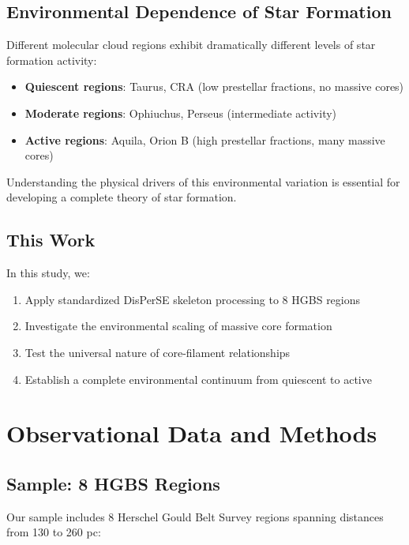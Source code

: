 \documentclass[11pt,a4paper]{article}
\begin{document}
\subsection{Environmental Dependence of Star Formation}

Different molecular cloud regions exhibit dramatically different levels of star formation activity:
\begin{itemize}
    \item \textbf{Quiescent regions}: Taurus, CRA (low prestellar fractions, no massive cores)
    \item \textbf{Moderate regions}: Ophiuchus, Perseus (intermediate activity)
    \item \textbf{Active regions}: Aquila, Orion B (high prestellar fractions, many massive cores)
\end{itemize}

Understanding the physical drivers of this environmental variation is essential for developing a complete theory of star formation.

\subsection{This Work}

In this study, we:
\begin{enumerate}
    \item Apply standardized DisPerSE skeleton processing to 8 HGBS regions
    \item Investigate the environmental scaling of massive core formation
    \item Test the universal nature of core-filament relationships
    \item Establish a complete environmental continuum from quiescent to active
\end{enumerate}

\section{Observational Data and Methods}

\subsection{Sample: 8 HGBS Regions}

Our sample includes 8 Herschel Gould Belt Survey regions spanning distances from 130 to 260 pc:
\end{document}
